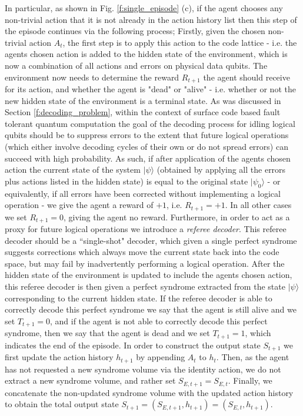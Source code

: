 \documentclass[twocolumn,preprintnumbers,amsmath,amssymb,notitlepage,nofootinbib,longbibliography,superscriptaddress,aps,pra,10pt]{revtex4-1}
\begin{document}
    In particular, as shown in Fig. \ref{f:single_episode} (c), if the agent chooses any non-trivial action that it is not already in the action history list then this step of the episode continues via the following process; 
    Firstly, given the chosen non-trivial action $A_t$, the first step is to apply this action to the code lattice - i.e. the agents chosen action is added to the hidden state of the environment, which is now a combination of all actions and errors on physical data qubits.
    The environment now needs to determine the reward $R_{t+1}$ the agent should receive for its action, and whether the agent is "dead" or "alive" - i.e. whether or not the new hidden state of the environment is a terminal state.
    As was discussed in Section \ref{f:decoding_problem}, within the context of surface code based fault tolerant quantum computation the goal of the decoding process for idling logical qubits should be to suppress errors to the extent that future logical operations (which either involve decoding cycles of their own or do not spread errors) can succeed with high probability.
    As such, if after application of the agents chosen action the current state of the system $|\psi\rangle$ (obtained by applying all the errors plus actions listed in the hidden state) is equal to the original state $|\psi_0\rangle$ - or equivalently, if all errors have been corrected without implementing a logical operation - we give the agent a reward of $+1$, i.e. $R_{t+1} = +1$.
    In all other cases we set $R_{t+1} = 0$, giving the agent no reward.
    Furthermore, in order to act as a proxy for future logical operations we introduce a \textit{referee decoder}.
    This referee decoder should be a ``single-shot" decoder, which given a single perfect syndrome suggests corrections which always move the current state back into the code space, but may fail by inadvertently performing a logical operation.
    After the hidden state of the environment is updated to include the agents chosen action, this referee decoder is then given a perfect syndrome extracted from the state $|\psi\rangle$ corresponding to the current hidden state.
    If the referee decoder is able to correctly decode this perfect syndrome we say that the agent is still alive and we set $T_{t+1} = 0$, and if the agent is not able to correctly decode this perfect syndrome, then we say that the agent is dead and we set $T_{t+1}=1$, which indicates the end of the episode.
    In order to construct the output state $S_{t+1}$ we first update the action history $h_{t+1}$ by appending $A_t$ to $h_t$.
    Then, as the agent has not requested a new syndrome volume via the identity action, we do not extract a new syndrome volume, and rather set $S_{E,{t+1}} = S_{E,t}$.
    Finally, we concatenate the non-updated syndrome volume with the updated action history to obtain the total output state $S_{t+1} = (S_{E,t+1},h_{t+1}) = (S_{E,t},h_{t+1})$.
\end{document}
